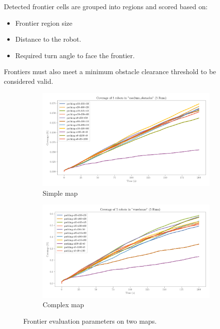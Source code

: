 Detected frontier cells are grouped into regions and scored based on:

\begin{itemize}
  \item Frontier region size
  \item Distance to the robot.
  \item Required turn angle to face the frontier.
\end{itemize}

Frontiers must also meet a minimum obstacle clearance threshold to be considered valid.

\begin{figure}[H]
    \centering
    \begin{subfigure}[b]{0.45\textwidth}
        \centering
        \includegraphics[width=\textwidth]{figures/frontier_eval_params_medium_obstacles.png}
        \caption{Simple map}
    \end{subfigure}
    \hfill
    \begin{subfigure}[b]{0.45\textwidth}
        \centering
        \includegraphics[width=\textwidth]{figures/frontier_eval_params_warehouse.png}
        \caption{Complex map}
    \end{subfigure}
    \caption{Frontier evaluation parameters on two maps.}
    \label{fig:frontier-eval-params}
\end{figure}

